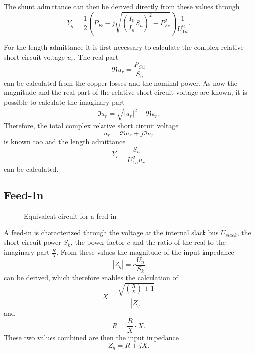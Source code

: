 The shunt admittance can then be derived directly from these values through
\begin{equation}
	Y_q = \frac{1}{2} \left( P_{Fe} - j \sqrt{\left( \frac{I_0}{I_n} S_n \right)^2 - P_{Fe}^2} \right) \frac{1}{U_{1n}^2}.
\end{equation}

For the length admittance it is first necessary to calculate the complex relative short circuit voltage $u_r$. The real part
\begin{equation}
	\Re{u_r} = \frac{P_{Cu}}{S_n}
\end{equation}
can be calculated from the copper losses and the nominal power. As now the magnitude and the real part of the relative short circuit voltage are known, it is possible to calculate the imaginary part
\begin{equation}
	\Im{u_r} = \sqrt{|u_r|^2 - \Re{u_r}}.
\end{equation}
Therefore, the total complex relative short circuit voltage
\begin{equation}
	u_r = \Re{u_r} + j \Im{u_r}
\end{equation}
is known too and the length admittance
\begin{equation}
	Y_l = \frac{S_n}{U_{1n}^2 u_r}
\end{equation}
can be calculated.

\subsection{Feed-In}

\begin{figure}
	\centering
	
	\caption{Equivalent circuit for a feed-in}
	\label{fig:feedin}
\end{figure}

A feed-in  is characterized through the voltage at the internal slack bus $U_{slack}$, the short circuit power $S_k$, the power factor $c$ and the ratio of the real to the imaginary part $\frac{R}{X}$. From these values the magnitude of the input impedance 
\begin{equation}
	|Z_q| = c \frac{U_n}{S_k}
\end{equation}
can be derived, which therefore enables the calculation of
\begin{equation}
	X = \frac{\sqrt{\left( \frac{R}{X} \right) + 1}}{|Z_q|}
\end{equation}
and
\begin{equation}
	R = \frac{R}{X} \cdot X.
\end{equation}
These two values combined are then the input impedance
\begin{equation}
	Z_q = R + j X.
\end{equation}

